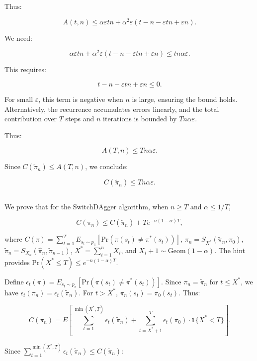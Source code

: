 \documentclass[12pt,oneside]{book}
\begin{document}
Thus:

\[
A(t, n) \leq \alpha \varepsilon t n + \alpha^2 \varepsilon (t - n - \varepsilon t n + \varepsilon n).
\]

We need:

\[
\alpha \varepsilon t n + \alpha^2 \varepsilon (t - n - \varepsilon t n + \varepsilon n) \leq t n \alpha \varepsilon.
\]

This requires:

\[
t - n - \varepsilon t n + \varepsilon n \leq 0.
\]

For small \(\varepsilon\), this term is negative when \( n \) is large, ensuring the bound holds. Alternatively, the recurrence accumulates errors linearly, and the total contribution over \( T \) steps and \( n \) iterations is bounded by \( T n \alpha \varepsilon \).

Thus:

\[
A(T, n) \leq T n \alpha \varepsilon.
\]

Since \( C(\tilde{\pi}_n) \leq A(T, n) \), we conclude:

\[
C(\tilde{\pi}_n) \leq T n \alpha \varepsilon.
\]

\subsection{ }
We prove that for the SwitchDAgger algorithm, when \( n \geq T \) and \( \alpha \leq 1/T \),

\[
C(\pi_n) \leq C(\tilde{\pi}_n) + T e^{-n (1-\alpha)T},
\]

where \( C(\pi) = \sum_{t=1}^T E_{s_t \sim p_\pi} [\text{Pr}(\pi(s_t) \neq \pi^*(s_t))] \), \(\pi_n = S_{X^*}(\tilde{\pi}_n, \pi_0)\), \(\tilde{\pi}_n = S_{X_n}(\hat{\pi}_n, \tilde{\pi}_{n-1})\), \( X^* = \sum_{i=1}^n X_i \), and \( X_i + 1 \sim \text{Geom}(1 - \alpha) \). The hint provides \(\text{Pr}(X^* \leq T) \leq e^{-n (1-\alpha)T}\).

Define \(\epsilon_t(\pi) = E_{s_t \sim p_\pi} [\text{Pr}(\pi(s_t) \neq \pi^*(s_t))]\). Since \(\pi_n = \tilde{\pi}_n\) for \( t \leq X^* \), we have \(\epsilon_t(\pi_n) = \epsilon_t(\tilde{\pi}_n)\). For \( t > X^* \), \(\pi_n(s_t) = \pi_0(s_t)\). Thus:

\[
C(\pi_n) = E\left[ \sum_{t=1}^{\min(X^*, T)} \epsilon_t(\tilde{\pi}_n) + \sum_{t=X^*+1}^T \epsilon_t(\pi_0) \cdot \mathbb{1}\{X^* < T\} \right].
\]

Since \(\sum_{t=1}^{\min(X^*, T)} \epsilon_t(\tilde{\pi}_n) \leq C(\tilde{\pi}_n)\):
\end{document}
